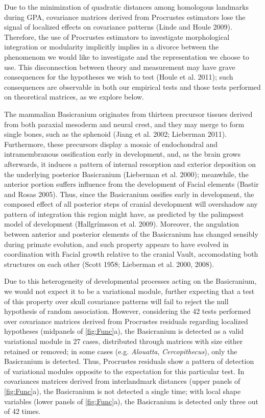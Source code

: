 \documentclass[12pt,]{article}
\begin{document}
Due to the minimization of quadratic distances among homologous
landmarks during GPA, covariance matrices derived from Procrustes
estimators lose the signal of localized effects on covariance patterns
(Linde and Houle 2009). Therefore, the use of Procrustes estimators to
investigate morphological integration or modularity implicitly implies
in a divorce between the phenomenom we would like to investigate and the
representation we choose to use. This disconnection between theory and
measurement may have grave consequences for the hypotheses we wish to
test (Houle et al. 2011); such consequences are observable in both our
empirical tests and those tests performed on theoretical matrices, as we
explore below.

The mammalian Basicranium originates from thirteen precursor tissues
derived from both paraxial mesoderm and neural crest, and they may merge
to form single bones, such as the sphenoid (Jiang et al. 2002; Lieberman
2011). Furthermore, these precursors display a mosaic of endochondral
and intramembranous ossification early in development, and, as the brain
grows afterwards, it induces a pattern of internal resorption and
exterior deposition on the underlying posterior Basicranium (Lieberman
et al. 2000); meanwhile, the anterior portion suffers influence from the
development of Facial elements (Bastir and Rosas 2005). Thus, since the
Basicranium ossifies early in development, the composed effect of all
posterior steps of cranial development will overshadow any pattern of
integration this region might have, as predicted by the palimpsest model
of development (Hallgrímsson et al. 2009). Moreover, the angulation
between anterior and posterior elements of the Basicranium has changed
sensibly during primate evolution, and such property appears to have
evolved in coordination with Facial growth relative to the cranial
Vault, accomodating both structures on each other (Scott 1958; Lieberman
et al. 2000, 2008).

Due to this heterogeneity of developmental processes acting on the
Basicranium, we would not expect it to be a variational module, further
expecting that a test of this property over skull covariance patterns
will fail to reject the null hypothesis of random association. However,
considering the 42 tests performed over covariance matrices derived from
Procrustes residuals regarding localized hypotheses (midpanels of
\autoref{fig:Func}a), the Basicranium is detected as a valid variational
module in 27 cases, distributed through matrices with size either
retained or removed; in some cases (e.g. \emph{Alouatta},
\emph{Cercopithecus}), only the Basicranium is detected. Thus,
Procrustes residuals show a pattern of detection of variational modules
opposite to the expectation for this particular test. In covariances
matrices derived from interlandmark distances (upper panels of
\autoref{fig:Func}a), the Basicranium is not detected a single time;
with local shape variables (lower panels of \autoref{fig:Func}a), the
Basicranium is detected only three out of 42 times.
\end{document}
